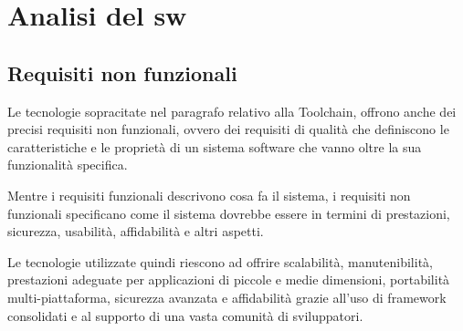 \section{Analisi del sw}
\subsection{Requisiti non funzionali}
Le tecnologie sopracitate nel paragrafo relativo alla Toolchain, offrono anche dei precisi
requisiti non funzionali, ovvero dei requisiti di qualità che definiscono le caratteristiche 
e le proprietà di un sistema software che vanno oltre la sua funzionalità specifica. 

Mentre i requisiti funzionali descrivono cosa fa il sistema, i requisiti non funzionali specificano come 
il sistema dovrebbe essere in termini di prestazioni, sicurezza, usabilità, affidabilità e altri aspetti.

Le tecnologie utilizzate quindi riescono ad offrire scalabilità, manutenibilità, prestazioni adeguate per 
applicazioni di piccole e medie dimensioni, portabilità multi-piattaforma, sicurezza avanzata e affidabilità 
grazie all'uso di framework consolidati e al supporto di una vasta comunità di sviluppatori.

